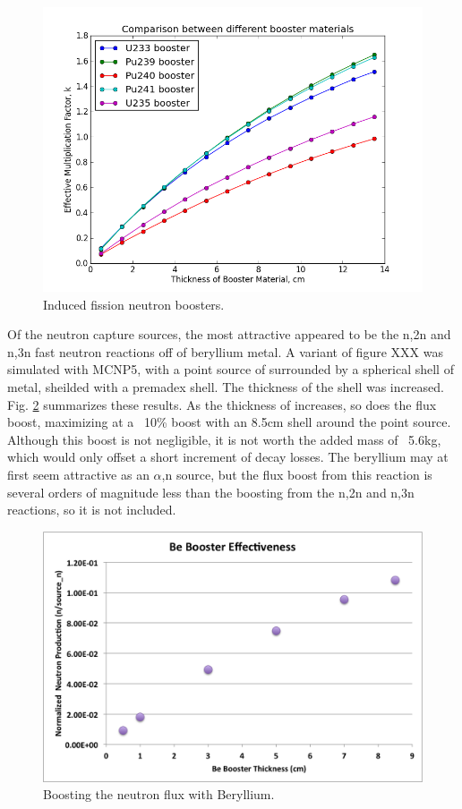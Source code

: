 \documentclass{mc2015}
\begin{document}
\begin{figure}[H]
  \centering
  \includegraphics[width=4.5in]{Boosters.png}
  \caption{Induced fission neutron boosters.}
  \label{fig:boosters}
\end{figure}

Of the neutron capture sources, the most attractive appeared to be the n,2n and n,3n fast neutron reactions off of beryllium metal. A variant of figure XXX was simulated with MCNP5, with a point source of  surrounded by a spherical shell of  metal, sheilded with a premadex shell. The thickness of the  shell was increased. Fig. \ref{fig:beboosters} summarizes these results. As the thickness of   increases, so does the flux boost, maximizing at a ~10\% boost with an 8.5cm shell around the point source. Although this boost is not negligible, it is not worth the added mass of ~5.6kg, which would only offset a short increment of  decay losses. The beryllium may at first seem attractive as an $\alpha$,n source, but the flux boost from this reaction is several orders of magnitude less than the boosting from the n,2n and n,3n reactions, so it is not included.  

\begin{figure}[H]
  \centering
  \includegraphics[width=4.5in]{Be_boost.png}
  \caption{Boosting the neutron flux with Beryllium.}
  \label{fig:beboosters}
\end{figure}
\end{document}
